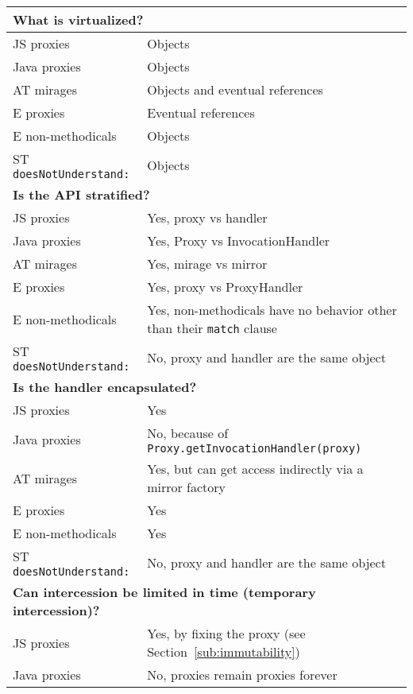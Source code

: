 \documentclass{acm_proc_article-sp}
\begin{document}
\begin{table*}
\centering
\begin{tabular}{|p{}|p{}|}
    \hline
    \multicolumn{2}{|l|}{\textbf{What is virtualized?}}\\
    \hline
    JS proxies        & Objects\\
    Java proxies      & Objects\\
    AT mirages        & Objects and eventual references\\
    E proxies         & Eventual references\\
    E non-methodicals & Objects\\
    ST \texttt{doesNotUnderstand:}  & Objects\\
    \hline
    \multicolumn{2}{|l|}{\textbf{Is the API stratified?}}\\
    \hline
    JS proxies        & Yes, proxy vs handler\\
    Java proxies      & Yes, Proxy vs InvocationHandler\\
    AT mirages        & Yes, mirage vs mirror\\
    E proxies         & Yes, proxy vs ProxyHandler\\
    E non-methodicals & Yes, non-methodicals have no behavior other than their \texttt{match} clause\\
    ST \texttt{doesNotUnderstand:}  & No, proxy and handler are the same object\\
    \hline
    \multicolumn{2}{|l|}{\textbf{Is the handler encapsulated?}}\\
    \hline
    JS proxies        & Yes\\
    Java proxies      & No, because of \texttt{Proxy.getInvocationHandler(proxy)}\\
    AT mirages        & Yes, but can get access indirectly via a mirror factory\\
    E proxies         & Yes\\
    E non-methodicals & Yes\\
    ST \texttt{doesNotUnderstand:}  & No, proxy and handler are the same object\\
    \hline
    \multicolumn{2}{|l|}{\textbf{Can intercession be limited in time (temporary intercession)?}}\\
    \hline
    JS proxies        & Yes, by fixing the proxy (see Section~\ref{sub:immutability})\\
    Java proxies      & No, proxies remain proxies forever\\

\end{tabular}
\end{table*}
\end{document}
